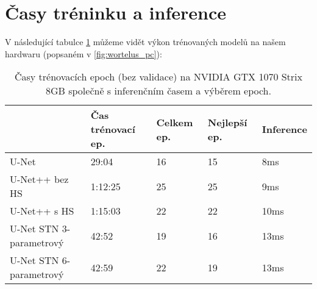 \section{Časy tréninku a inference}
\label{sec:Chapter61}
V následující tabulce \ref{tab:models_performance} můžeme vidět výkon trénovaných modelů na našem hardwaru (popsaném v \ref{fig:wortelus_pc}):
\begin{table}[H]
    \centering
    \begin{tabular}{lllll}
        \toprule
         & Čas trénovací ep. & Celkem ep. & Nejlepší ep. & Inference \\
         \midrule
         U-Net & 29:04 & 16 & 15 & 8ms \\
         U-Net++ bez HS & 1:12:25 & 25 & 25 & 9ms \\
         U-Net++ s HS & 1:15:03 & 22 & 22 & 10ms \\
         U-Net STN 3-parametrový & 42:52 & 19 & 16 & 13ms \\
         U-Net STN 6-parametrový & 42:59 & 22 & 19 & 13ms \\
         \bottomrule
    \end{tabular}
    \caption[Statistiky trénovaných modelů]{Časy trénovacích epoch (bez validace) na NVIDIA GTX 1070 Strix 8GB společně s inferenčním časem a výběrem epoch. }
    \label{tab:models_performance}
\end{table}

\endinput
